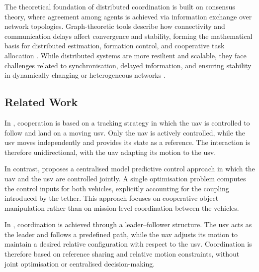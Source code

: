 The theoretical foundation of distributed coordination is built on consensus theory, where agreement among agents is achieved via information exchange over network topologies.
Graph-theoretic tools describe how connectivity and communication delays affect convergence and stability, forming the mathematical basis for distributed estimation, formation control, and cooperative task allocation \cite{mesbahiGraphTheoreticMethods2010,olfati-saberConsensusCooperationNetworked2007}.
While distributed systems are more resilient and scalable, they face challenges related to synchronisation, delayed information, and ensuring stability in dynamically changing or heterogeneous networks \cite{caoOverviewRecentProgress2013}.

\subsection{Related Work}

In \cite{liNMPCbasedUAVUSVCooperative2023}, cooperation is based on a tracking strategy in which the \gls{uav} is controlled to follow and land on a moving \gls{usv}. Only the \gls{uav} is actively controlled, while the \gls{usv} moves independently and provides its state as a reference. The interaction is therefore unidirectional, with the \gls{uav} adapting its motion to the \gls{usv}.

In contrast, \cite{novakCollaborativeObjectManipulation2024} proposes a centralised model predictive control approach in which the \gls{uav} and the \gls{usv} are controlled jointly. A single optimisation problem computes the control inputs for both vehicles, explicitly accounting for the coupling introduced by the tether. This approach focuses on cooperative object manipulation rather than on mission-level coordination between the vehicles.

In \cite{zhangCooperativeControlFramework2025}, coordination is achieved through a leader--follower structure. The \gls{usv} acts as the leader and follows a predefined path, while the \gls{uav} adjusts its motion to maintain a desired relative configuration with respect to the \gls{usv}. Coordination is therefore based on reference sharing and relative motion constraints, without joint optimisation or centralised decision-making.






